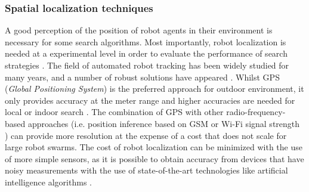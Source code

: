 














\vspace{-0.3cm}
\subsubsection{Spatial localization techniques}
\vspace{-0.3cm}

A good perception of the position of robot agents in their environment is necessary for some search algorithms. Most importantly, robot localization is needed at a experimental level in order to evaluate the performance of search strategies \cite{jatmiko2011robots, Fox00Pro}.
The field of automated robot tracking has been widely studied for many years, and a number of robust solutions have appeared \cite{Gut02Exp}. Whilst GPS (\emph{Global Positioning System}) is the preferred approach for outdoor environment, it only provides accuracy at the meter range and higher accuracies are needed for local or indoor search \cite{ChenSun10}.
The combination of GPS with other radio-frequency-based approaches (i.e. position inference based on GSM or Wi-Fi signal strength \cite{Ferris06gaussianprocesses}) can provide more resolution at the expense of a cost that does not scale for large robot swarms.
The cost of robot localization can be minimized with the use of more simple sensors, as it is possible to obtain accuracy from
devices that have noisy measurements
with the use of state-of-the-art technologies like artificial intelligence algorithms \cite{Thrun98landmark, FoxKo05}.

